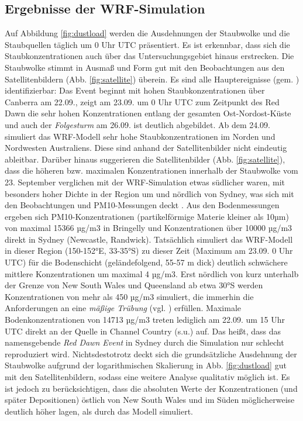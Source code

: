 \documentclass[12pt,a4paper,onecolumn]{scrartcl}
\begin{document}
\subsection{Ergebnisse der WRF-Simulation}
Auf Abbildung \ref{fig:dustload} werden die Ausdehnungen der Staubwolke und die Staubquellen täglich um 0 Uhr UTC präsentiert. Es ist erkennbar, dass sich die Staubkonzentrationen auch über das Untersuchungsgebiet hinaus erstrecken. Die Staubwolke stimmt in Ausmaß und Form gut mit den Beobachtungen aus den Satellitenbildern (Abb. \ref{fig:satellite}) überein. Es sind alle Hauptereignisse (gem. \cite{Leys.2009}) identifizierbar: Das Event beginnt mit hohen Staubkonzentrationen über Canberra am 22.09., zeigt am 23.09. um 0 Uhr UTC zum Zeitpunkt des Red Dawn die sehr hohen Konzentrationen entlang der gesamten Ost-Nordost-Küste und auch der \textit{Folgesturm} am 26.09. ist deutlich abgebildet. Ab dem 24.09. simuliert das WRF-Modell sehr hohe Staubkonzentrationen im Norden und Nordwesten Australiens. Diese sind anhand der Satellitenbilder nicht eindeutig ableitbar. Darüber hinaus suggerieren die Satellitenbilder (Abb. \ref{fig:satellite}), dass die höheren bzw. maximalen Konzentrationen innerhalb der Staubwolke vom 23. September verglichen mit der WRF-Simulation etwas südlicher waren, mit besonders hoher Dichte in der Region um und nördlich von Sydney, was sich mit den Beobachtungen und PM10-Messungen deckt \citep{Leys.2011}. Aus den Bodenmessungen ergeben sich PM10-Konzentrationen (partikelförmige Materie kleiner als 10µm) von maximal 15366 µg/m3 in Bringelly und Konzentrationen über 10000 µg/m3 direkt in Sydney (Newcastle, Randwick). Tatsächlich simuliert das WRF-Modell in dieser Region (150-152°E, 33-35°S) zu dieser Zeit (Maximum am 23.09. 0 Uhr UTC) für die Bodenschicht (geländefolgend, 55-57 m dick) deutlich schwächere mittlere Konzentrationen um maximal 4 µg/m3. Erst nördlich von kurz unterhalb der Grenze von New South Wales und Queensland ab etwa 30°S werden Konzentrationen von mehr als 450 µg/m3 simuliert, die immerhin die Anforderungen an eine \textit{mäßige Trübung} (vgl. \cite{Leys.2011}) erfüllen. Maximale Bodenkonzentrationen von 14713 µg/m3 treten lediglich am 22.09. um 15 Uhr UTC direkt an der Quelle in Channel Country (s.u.) auf. Das heißt, dass das namensgebende \textit{Red Dawn Event} in Sydney durch die Simulation nur schlecht reproduziert wird. Nichtsdestotrotz deckt sich die grundsätzliche Ausdehnung der Staubwolke aufgrund der logarithmischen Skalierung in Abb. \ref{fig:dustload} gut mit den Satellitenbildern, sodass eine weitere Analyse qualitativ möglich ist. Es ist jedoch zu berücksichtigen, dass die absoluten Werte der Konzentrationen (und später Depositionen) östlich von New South Wales und im Süden möglicherweise deutlich höher lagen, als durch das Modell simuliert.
\end{document}
